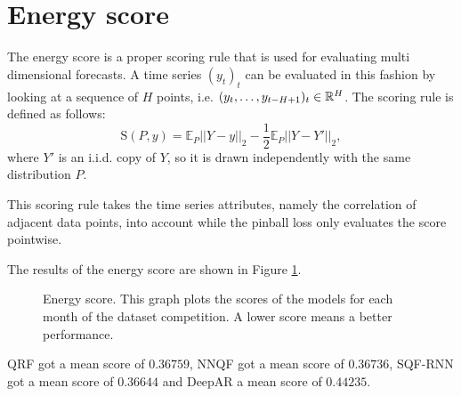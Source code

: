 \section{Energy score}

The energy score is a proper scoring rule that is used for 
evaluating multi dimensional forecasts. A time series \((y_t)_t\) 
can be evaluated in this fashion by looking at a sequence of \(H\) 
points, i.e. \((y_t, \ldots, y_{t-H+1})_t \in \mathbb{R}^H\). 
The scoring rule is defined as follows:
\[ \mathrm{S}(P, y) = \mathbb{E}_P ||Y-y||_2 - \frac{1}{2} \mathbb{E}_P ||Y-Y'||_2, \]
where \(Y'\) is an i.i.d. copy of \(Y\), so it is drawn independently with the same distribution \(P\).

This scoring rule takes the time series attributes, namely the 
correlation of adjacent data points, into account while 
the pinball loss only evaluates the score pointwise.

The results of the energy score are shown in Figure \ref{fig:energy-score}.

\begin{figure}[ht]
    \centering
    
    \caption[Energy score]{Energy score. 
    This graph plots the scores of the models for each month of the dataset competition. A lower score means a better performance.}
    \label{fig:energy-score}
\end{figure}

QRF got a mean score of \(0.36759\), NNQF got a mean score of \(0.36736\), 
SQF-RNN got a mean score of \(0.36644\) and DeepAR a mean score of \(0.44235\).
